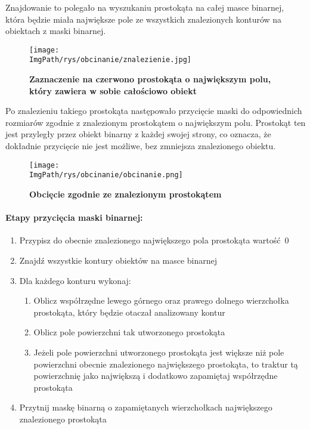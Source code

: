 \documentclass[a4paper,12pt,twoside,openany]{report}
\newcommand{\ImgPath}{.}
\begin{document}
Znajdowanie to polegało na wyszukaniu prostokąta na całej masce binarnej, która będzie miała największe pole ze wszystkich znalezionych konturów na obiektach z maski binarnej. 

\begin{figure}[H]
	\centering
	{\label{fig:a}\texttt{[image: \\ImgPath/rys/obcinanie/znalezienie.jpg]}}
	\caption{  \textbf{Zaznaczenie na czerwono prostokąta o największym polu, który zawiera w sobie całościowo obiekt}}
\end{figure}

Po znalezieniu takiego prostokąta następowało przycięcie maski do odpowiednich rozmiarów zgodnie z znalezionym prostokątem o największym polu. Prostokąt ten jest przyległy przez obiekt binarny z każdej swojej strony, co oznacza, że dokładnie przycięcie nie jest możliwe, bez zmniejsza znalezionego obiektu.

\begin{figure}[H]
	\centering
	{\label{fig:b}\texttt{[image: \\ImgPath/rys/obcinanie/obcinanie.png]}}
	\caption{  \textbf{Obcięcie zgodnie ze znalezionym prostokątem}}
\end{figure}
\paragraph{Etapy przycięcia maski binarnej:}
\begin{enumerate}
	\item Przypisz do obecnie znalezionego największego pola prostokąta wartość~0
	\item Znajdź wszystkie kontury obiektów na masce binarnej
	\item Dla każdego konturu wykonaj:
	\begin{enumerate}
		\item Oblicz współrzędne lewego górnego oraz prawego dolnego wierzchołka prostokąta, który będzie otaczał analizowany kontur 
		\item Oblicz pole powierzchni tak utworzonego prostokąta
		\item Jeżeli pole powierzchni utworzonego prostokąta jest większe niż pole powierzchni obecnie znalezionego największego prostokąta, to traktur tą powierzchnię jako największą i dodatkowo zapamiętaj współrzędne prostokąta
	\end{enumerate}
	\item Przytnij maskę binarną o zapamiętanych wierzchołkach największego znalezionego prostokąta
\end{enumerate}
\end{document}
